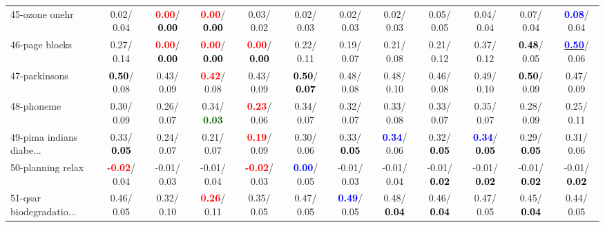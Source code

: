 \begin{table}[h]
\begin{center}
{\begin{tabular}{lc|c|c|c|c|c|c|c|c|c|c}
45-ozone onehr &   0.02/  0.04 & \textcolor{red}{\textbf{  0.00}}/\textcolor{black}{\textbf{  0.00}} & \textcolor{red}{\textbf{  0.00}}/\textcolor{black}{\textbf{  0.00}} &   0.03/  0.02 &   0.02/  0.03 &   0.02/  0.03 &   0.02/  0.03 &   0.05/  0.05 &   0.04/  0.04 &   0.07/  0.04 & \textcolor{blue}{\textbf{  0.08}}/  0.04 \\
46-page blocks &   0.27/  0.14 & \textcolor{red}{\textbf{  0.00}}/\textcolor{black}{\textbf{  0.00}} & \textcolor{red}{\textbf{  0.00}}/\textcolor{black}{\textbf{  0.00}} & \textcolor{red}{\textbf{  0.00}}/\textcolor{black}{\textbf{  0.00}} &   0.22/  0.11 &   0.19/  0.07 &   0.21/  0.08 &   0.21/  0.12 &   0.37/  0.12 & \textcolor{black}{\textbf{  0.48}}/  0.05 & \underline{\textcolor{blue}{\textbf{  0.50}}}/  0.06 \\ \hline
47-parkinsons & \textcolor{black}{\textbf{  0.50}}/  0.08 &   0.43/  0.09 & \textcolor{red}{\textbf{  0.42}}/  0.08 &   0.43/  0.09 & \textcolor{black}{\textbf{  0.50}}/\textcolor{black}{\textbf{  0.07}} &   0.48/  0.08 &   0.48/  0.10 &   0.46/  0.08 &   0.49/  0.10 & \textcolor{black}{\textbf{  0.50}}/  0.09 &   0.47/  0.09 \\
48-phoneme &   0.30/  0.09 &   0.26/  0.07 &   0.34/\textcolor{darkgreen}{\textbf{  0.03}} & \textcolor{red}{\textbf{  0.23}}/  0.06 &   0.34/  0.07 &   0.32/  0.07 &   0.33/  0.08 &   0.33/  0.07 &   0.35/  0.07 &   0.28/  0.09 &   0.25/  0.11 \\
49-pima indians diabe... &   0.33/\textcolor{black}{\textbf{  0.05}} &   0.24/  0.07 &   0.21/  0.07 & \textcolor{red}{\textbf{  0.19}}/  0.09 &   0.30/  0.06 &   0.33/\textcolor{black}{\textbf{  0.05}} & \textcolor{blue}{\textbf{  0.34}}/  0.06 &   0.32/\textcolor{black}{\textbf{  0.05}} & \textcolor{blue}{\textbf{  0.34}}/\textcolor{black}{\textbf{  0.05}} &   0.29/\textcolor{black}{\textbf{  0.05}} &   0.31/  0.06 \\
50-planning relax & \textcolor{red}{\textbf{ -0.02}}/  0.04 &  -0.01/  0.03 &  -0.01/  0.04 & \textcolor{red}{\textbf{ -0.02}}/  0.03 & \textcolor{blue}{\textbf{  0.00}}/  0.05 &  -0.01/  0.03 &  -0.01/  0.04 &  -0.01/\textcolor{black}{\textbf{  0.02}} &  -0.01/\textcolor{black}{\textbf{  0.02}} &  -0.01/\textcolor{black}{\textbf{  0.02}} &  -0.01/\textcolor{black}{\textbf{  0.02}} \\
51-qsar biodegradatio... &   0.46/  0.05 &   0.32/  0.10 & \textcolor{red}{\textbf{  0.26}}/  0.11 &   0.35/  0.05 &   0.47/  0.05 & \textcolor{blue}{\textbf{  0.49}}/  0.05 &   0.48/\textcolor{black}{\textbf{  0.04}} &   0.46/\textcolor{black}{\textbf{  0.04}} &   0.47/  0.05 &   0.45/\textcolor{black}{\textbf{  0.04}} &   0.44/  0.05 \\

\end{tabular}}
\end{center}
\end{table}
